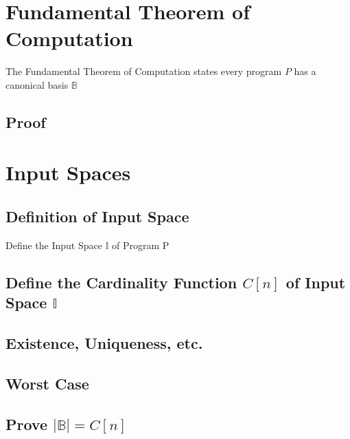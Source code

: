 \documentclass[11pt]{article}
\begin{document}
\newpage
\section{Fundamental Theorem of Computation}
The Fundamental Theorem of Computation states every program $P$ has a canonical basis $\mathbb{B}$ 




\subsection{Proof}













\newpage
\section{Input Spaces}
\subsection{Definition of Input Space}
Define the Input Space $\mathbb{I}$ of Program P
\subsection{Define the Cardinality Function $C[n]$ of Input Space $\mathbb{I}$}
\subsection{Existence, Uniqueness, etc.}
\subsection{Worst Case}
\subsection{Prove $|\mathbb{B}|=C[n]$}








\newpage
\end{document}
